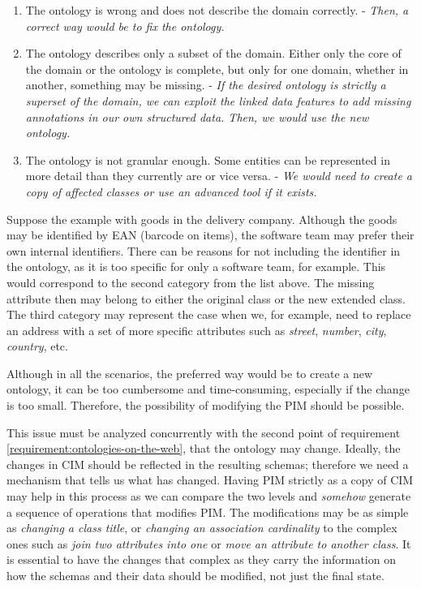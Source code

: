 \begin{enumerate}
    \item The ontology is wrong and does not describe the domain correctly. - \textit{Then, a correct way would be to fix the ontology.}
    \item The ontology describes only a subset of the domain. Either only the core of the domain or the ontology is complete, but only for one domain, whether in another, something may be missing. - \textit{If the desired ontology is strictly a superset of the domain, we can exploit the linked data features to add missing annotations in our own structured data. Then, we would use the new ontology.}
    \item The ontology is not granular enough. Some entities can be represented in more detail than they currently are or vice versa. - \textit{We would need to create a copy of affected classes or use an advanced tool if it exists.}
\end{enumerate}

Suppose the example with goods in the delivery company. Although the goods may be identified by EAN (barcode on items), the software team may prefer their own internal identifiers. There can be reasons for not including the identifier in the ontology, as it is too specific for only a software team, for example. This would correspond to the second category from the list above. The missing attribute then may belong to either the original class or the new extended class. The third category may represent the case when we, for example, need to replace an address with a set of more specific attributes such as \textit{street}, \textit{number}, \textit{city}, \textit{country}, etc.

Although in all the scenarios, the preferred way would be to create a new ontology, it can be too cumbersome and time-consuming, especially if the change is too small. Therefore, the possibility of modifying the PIM should be possible.

\smallskip

This issue must be analyzed concurrently with the second point of requirement \ref{requirement:ontologies-on-the-web}, that the ontology may change. Ideally, the changes in CIM should be reflected in the resulting schemas; therefore we need a mechanism that tells us what has changed. Having PIM strictly as a copy of CIM may help in this process as we can compare the two levels and \textit{somehow} generate a sequence of operations that modifies PIM. The modifications may be as simple as \textit{changing a class title}, or \textit{changing an association cardinality} to the complex ones such as \textit{join two attributes into one} or \textit{move an attribute to another class}. It is essential to have the changes that complex as they carry the information on how the schemas and their data should be modified, not just the final state.

